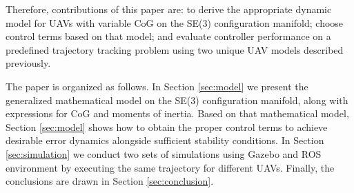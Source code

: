 Therefore, contributions of this paper are: to derive the appropriate dynamic model for UAVs with variable CoG on the SE(3) configuration manifold; choose control terms based on that model; and evaluate controller performance on a predefined trajectory tracking problem using two unique UAV models described previously. 

The paper is organized as follows. In Section \ref{sec:model} we present the generalized mathematical model on the SE(3) configuration manifold, along with expressions for CoG and moments of inertia. Based on that mathematical model, Section \ref{sec:model} shows how to obtain the proper control terms to achieve desirable error dynamics alongside sufficient stability conditions. In Section \ref{sec:simulation} we conduct two sets of simulations using Gazebo and ROS environment by executing the same trajectory for different UAVs. Finally, the conclusions are drawn in Section \ref{sec:conclusion}.

